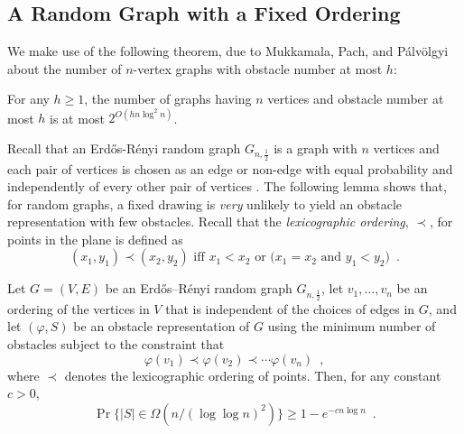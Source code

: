 \documentclass[12pt]{article}
\begin{document}
\subsection{A Random Graph with a Fixed Ordering}

We make use of the following theorem, due to Mukkamala, Pach, and
P\'alv\"olgyi \cite[Theorem~1]{mukkamala.pach.ea:lower} about the number
of $n$-vertex graphs with obstacle number at most $h$:
\begin{thm}
  For any $h\ge 1$, the number of graphs having $n$ vertices and
  obstacle number at most $h$ is at most $2^{O(hn\log^2 n)}$.
\end{thm}

Recall that an Erd\H{o}s-R\'enyi random graph $G_{n,\frac{1}{2}}$ is a
graph with $n$ vertices and each pair of vertices is chosen as an edge
or non-edge with equal probability and independently of every other pair
of vertices \cite{erdos.renyi:random}.  The following lemma shows that,
for random graphs, a fixed drawing is \emph{very} unlikely to yield
an obstacle representation with few obstacles.  Recall that the \emph{lexicographic ordering}, $\prec$, for points in the plane is defined as
\[
      (x_1,y_1) \prec (x_2,y_2) \text{ iff $x_1<x_2$ or ($x_1=x_2$ and $y_1<y_2$)} \enspace .
\]


\begin{lem}
  Let $G=(V,E)$ be an Erd\H{o}s--R\'enyi random graph $G_{n,\frac{1}{2}}$,
  let $v_1,\ldots,v_n$ be an ordering of the vertices
  in $V$ that is independent of the choices of edges in $G$,
  and let $(\varphi, S)$ be an obstacle representation of $G$
  using the minimum number of obstacles subject to the constraint
  that 
  \[ \varphi(v_1)\prec \varphi(v_2)\prec \cdots\varphi(v_n) \enspace ,\]
  where $\prec$ denotes the lexicographic ordering of points.
  Then, for any constant $c>0$,
  \[
     \Pr\{|S| \in \Omega(n/(\log\log n)^2)\} \ge 1-e^{-cn\log n}  \enspace .
  \] 
\end{lem}
\end{document}
